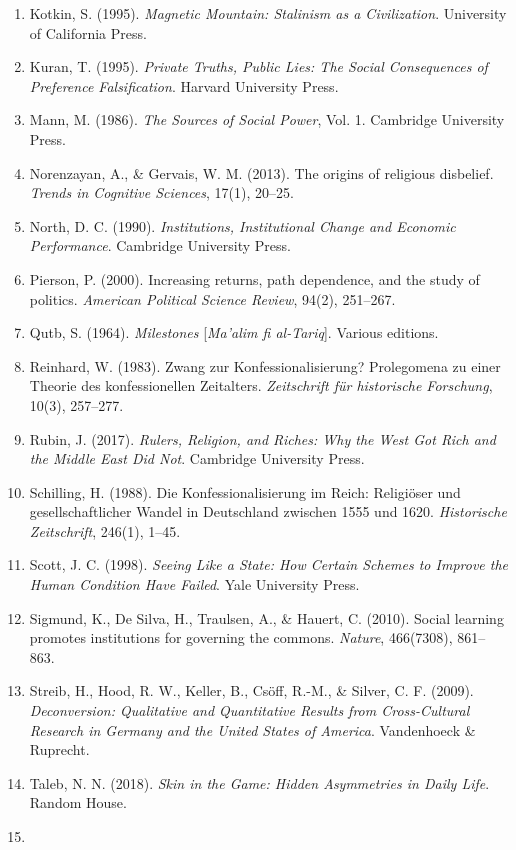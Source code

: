 \documentclass[12pt]{article}
\begin{document}
\begin{enumerate}
\item
  Kotkin, S. (1995). \emph{Magnetic Mountain: Stalinism as a Civilization}. University of California Press.
\item
  Kuran, T. (1995). \emph{Private Truths, Public Lies: The Social Consequences of Preference Falsification}. Harvard University Press.
\item
  Mann, M. (1986). \emph{The Sources of Social Power}, Vol. 1. Cambridge University Press.
\item
  Norenzayan, A., \& Gervais, W. M. (2013). The origins of religious disbelief. \emph{Trends in Cognitive Sciences}, 17(1), 20--25.
\item
  North, D. C. (1990). \emph{Institutions, Institutional Change and Economic Performance}. Cambridge University Press.
\item
  Pierson, P. (2000). Increasing returns, path dependence, and the study of politics. \emph{American Political Science Review}, 94(2), 251--267.
\item
  Qutb, S. (1964). \emph{Milestones} [\emph{Ma'alim fi al-Tariq}]. Various editions.
\item
  Reinhard, W. (1983). Zwang zur Konfessionalisierung? Prolegomena zu einer Theorie des konfessionellen Zeitalters. \emph{Zeitschrift für historische Forschung}, 10(3), 257--277.
\item
  Rubin, J. (2017). \emph{Rulers, Religion, and Riches: Why the West Got Rich and the Middle East Did Not}. Cambridge University Press.
\item
  Schilling, H. (1988). Die Konfessionalisierung im Reich: Religiöser und gesellschaftlicher Wandel in Deutschland zwischen 1555 und 1620. \emph{Historische Zeitschrift}, 246(1), 1--45.
\item
  Scott, J. C. (1998). \emph{Seeing Like a State: How Certain Schemes to Improve the Human Condition Have Failed}. Yale University Press.
\item
  Sigmund, K., De Silva, H., Traulsen, A., \& Hauert, C. (2010). Social learning promotes institutions for governing the commons. \emph{Nature}, 466(7308), 861--863.
\item
  Streib, H., Hood, R. W., Keller, B., Csöff, R.-M., \& Silver, C. F. (2009). \emph{Deconversion: Qualitative and Quantitative Results from Cross-Cultural Research in Germany and the United States of America}. Vandenhoeck \& Ruprecht.
\item
  Taleb, N. N. (2018). \emph{Skin in the Game: Hidden Asymmetries in Daily Life}. Random House.
\item

\end{enumerate}
\end{document}
